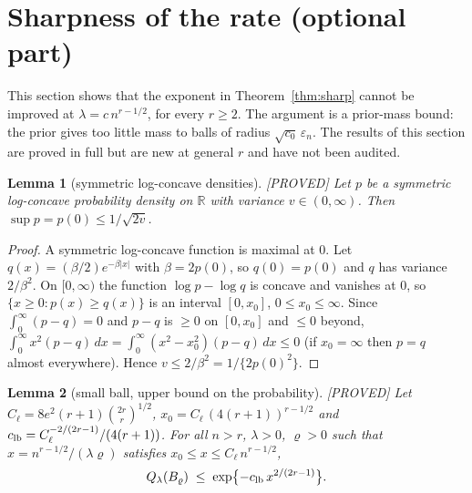 \documentclass[11pt]{article}
\newtheorem{lemma}{Lemma}
\theoremstyle{definition}
\theoremstyle{remark}
\newcommand{\R}{\mathbb{R}}
\newcommand{\en}{\varepsilon_n}
\newcommand{\Ql}{Q_\lambda}
\newcommand{\proved}{\textup{[PROVED]}}
\begin{document}
\section{Sharpness of the rate (optional part)}\label{sec:lower}

This section shows that the exponent in Theorem~\ref{thm:sharp} cannot be improved at $\lambda=c\,n^{r-1/2}$, for every $r\ge2$. The argument is a prior-mass bound: the prior gives too little mass to balls of radius $\sqrt{c_0}\,\en$. The results of this section are proved in full but are new at general $r$ and have not been audited.

\begin{lemma}[symmetric log-concave densities]\label{lem:lc}\proved{}
Let $p$ be a symmetric log-concave probability density on $\R$ with variance $v\in(0,\infty)$. Then $\sup p=p(0)\le1/\sqrt{2v}$.
\end{lemma}

\begin{proof}
A symmetric log-concave function is maximal at $0$. Let $q(x)=(\beta/2)e^{-\beta|x|}$ with $\beta=2p(0)$, so $q(0)=p(0)$ and $q$ has variance $2/\beta^2$. On $[0,\infty)$ the function $\log p-\log q$ is concave and vanishes at $0$, so $\{x\ge0:p(x)\ge q(x)\}$ is an interval $[0,x_0]$, $0\le x_0\le\infty$. Since $\int_0^\infty(p-q)=0$ and $p-q$ is $\ge0$ on $[0,x_0]$ and $\le0$ beyond, $\int_0^\infty x^2(p-q)\,dx=\int_0^\infty(x^2-x_0^2)(p-q)\,dx\le0$ (if $x_0=\infty$ then $p=q$ almost everywhere). Hence $v\le2/\beta^2=1/\{2p(0)^2\}$.
\end{proof}

\begin{lemma}[small ball, upper bound on the probability]\label{lem:sbu}\proved{}
Let $C_\ell=8e^2(r+1)\binom{2r}r^{1/2}$, $x_0=C_\ell\,(4(r+1))^{r-1/2}$ and $c_{\rm lb}=C_\ell^{-2/(2r-1)}/(4(r+1))$. For all $n>r$, $\lambda>0$, $\varrho>0$ such that $x=n^{r-1/2}/(\lambda\varrho)$ satisfies $x_0\le x\le C_\ell\,n^{r-1/2}$,
\[
\Ql(B_\varrho)\;\le\;\exp\bigl\{-c_{\rm lb}\,x^{2/(2r-1)}\bigr\}.
\]
\end{lemma}
\end{document}
